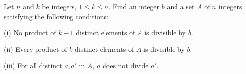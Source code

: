 Let $n$ and $k$ be integers, $1\le k\le n$. Find an integer $b$ and a set $A$ of $n$ integers satisfying the following conditions:

(i) No product of $k-1$ distinct elements of $A$ is divisible by $b$.

(ii) Every product of $k$ distinct elements of $A$ is divisible by $b$.

(iii) For all distinct $a,a'$ in $A$,  $a$ does not divide $a'$.